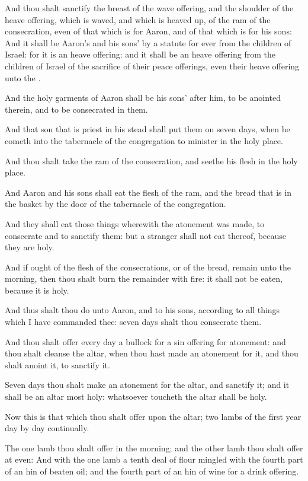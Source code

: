 \Verse And thou shalt sanctify the breast of the wave offering, and the shoulder of the heave offering, which is waved, and which is heaved up, of the ram of the consecration, even of that which is for Aaron, and of that which is for his sons: \Verse And it shall be Aaron's and his sons' by a statute for ever from the children of Israel: for it is an heave offering: and it shall be an heave offering from the children of Israel of the sacrifice of their peace offerings, even their heave offering unto the \LORD.

\Verse And the holy garments of Aaron shall be his sons' after him, to be anointed therein, and to be consecrated in them.

\Verse And that son that is priest in his stead shall put them on seven days, when he cometh into the tabernacle of the congregation to minister in the holy place.

\Verse And thou shalt take the ram of the consecration, and seethe his flesh in the holy place.

\Verse And Aaron and his sons shall eat the flesh of the ram, and the bread that is in the basket by the door of the tabernacle of the congregation.

\Verse And they shall eat those things wherewith the atonement was made, to consecrate and to sanctify them: but a stranger shall not eat thereof, because they are holy.

\Verse And if ought of the flesh of the consecrations, or of the bread, remain unto the morning, then thou shalt burn the remainder with fire: it shall not be eaten, because it is holy.

\Verse And thus shalt thou do unto Aaron, and to his sons, according to all things which I have commanded thee: seven days shalt thou consecrate them.

\Verse And thou shalt offer every day a bullock for a sin offering for atonement: and thou shalt cleanse the altar, when thou hast made an atonement for it, and thou shalt anoint it, to sanctify it.

\Verse Seven days thou shalt make an atonement for the altar, and sanctify it; and it shall be an altar most holy: whatsoever toucheth the altar shall be holy.

\Verse Now this is that which thou shalt offer upon the altar; two lambs of the first year day by day continually.

\Verse The one lamb thou shalt offer in the morning; and the other lamb thou shalt offer at even: \Verse And with the one lamb a tenth deal of flour mingled with the fourth part of an hin of beaten oil; and the fourth part of an hin of wine for a drink offering.

